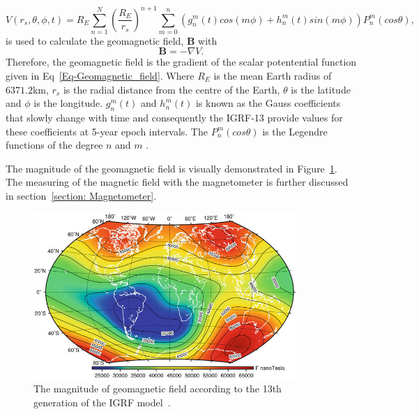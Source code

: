 \begin{equation}
\label{Eq-Geomagnetic_field}
V(r_s,\theta, \phi, t) = R_E \sum_{n=1}^{N}\left(\frac{R_E}{r_s}\right)^{n+1}\sum_{m=0}^{n}\left(g_n^m(t)cos(m\phi) + h_n^m(t)sin(m\phi)\right)P_n^m(cos\theta),
\end{equation}
is used to calculate the geomagnetic field, $\mathbf{B}$ with
\begin{equation}
\label{Eq-Geomagnetic_field_strength}
\mathbf{B} = - \nabla V.
\end{equation}
Therefore, the geomagnetic field is the gradient of the scalar potentential function given in Eq~\ref{Eq-Geomagnetic_field}. Where $R_E$ is the mean Earth radius of $\num{6371.2}$km, $r_s$ is the radial distance from the centre of the Earth, $\theta$ is the latitude and $\phi$ is the longitude. $g_n^m(t)$ and $h_n^m(t)$ is known as the Gauss coefficients that slowly change with time and consequently the IGRF-13 provide values for these coefficients at 5-year epoch intervals. The $P_n^m(cos\theta)$ is the Legendre functions of the degree $n$ and $m$ \cite{winch2005geomagnetism}.

The magnitude of the geomagnetic field is visually demonstrated in Figure~\ref{fig:IGRF13th}. The measuring of the magnetic field with the magnetometer is further discussed in section~\ref{section: Magnetometer}.

\begin{figure}[!htb]
	\centering
	\includegraphics[width = 10cm]{Figures/IGRF-13th.png}
	\caption{The magnitude of geomagnetic field according to the 13th generation of the IGRF model~\cite{koskinen2022radiation}.}
	\label{fig:IGRF13th}
\end{figure}

